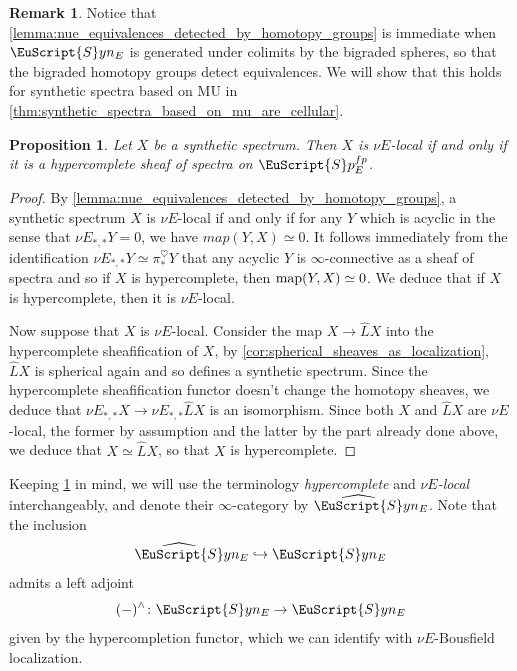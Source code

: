 \documentclass[oneside,a4paper]{amsart}
\newcommand{\euscr}[1]{\EuScript{#1}} %
\newcommand{\map}{\textnormal{map}} %
\newcommand{\MU}{\mathrm{MU}} %
\newcommand{\spectra}{\euscr{S}p} %
\newcommand{\synspectra}{\euscr{S}yn} %
\newcommand{\hpsynspectra}{\widehat{\euscr{S}}yn} %
\theoremstyle{plain}
\newtheorem{prop}[thm]{Proposition}
\theoremstyle{definition}
\newtheorem{rem}[thm]{Remark}
\theoremstyle{remark}
\begin{document}
\begin{rem}
Notice that \cref{lemma:nue_equivalences_detected_by_homotopy_groups} is immediate when $\synspectra_{E}$ is generated under colimits by the bigraded spheres, so that the bigraded homotopy groups detect equivalences. We will show that this holds for synthetic spectra based on $\MU$ in \cref{thm:synthetic_spectra_based_on_mu_are_cellular}.
\end{rem}

\begin{prop}
\label{prop:synthetic_spectrum_nue_local_iff_hypercomplete}
Let $X$ be a synthetic spectrum. Then $X$ is $\nu E$-local if and only if it is a hypercomplete sheaf of spectra on $\spectra_{E}^{fp}$. 
\end{prop}

\begin{proof}
By \cref{lemma:nue_equivalences_detected_by_homotopy_groups}, a synthetic spectrum $X$ is $\nu E$-local if and only if for any $Y$ which is acyclic in the sense that $\nu E_{*, *}Y = 0$, we have $map(Y, X) \simeq 0$. It follows immediately from the identification $\nu E_{*, *} Y \simeq \pi_{*}^{\heartsuit} Y$ that any acyclic $Y$ is $\infty$-connective as a sheaf of spectra and so if $X$ is hypercomplete, then $\map(Y, X) \simeq 0$. We deduce that if $X$ is hypercomplete, then it is $\nu E$-local. 

Now suppose that $X$ is $\nu E$-local. Consider the map $X \rightarrow \widehat{L}X$ into the hypercomplete sheafification of $X$, by \cref{cor:spherical_sheaves_as_localization}, $\widehat{L}X$ is spherical again and so defines a synthetic spectrum. Since the hypercomplete sheafification functor doesn't change the homotopy sheaves, we deduce that $\nu E_{*, *} X \rightarrow \nu E_{*, *} \widehat{L}X$ is an isomorphism. Since both $X$ and $\widehat{L}X$ are $\nu E$-local, the former by assumption and the latter by the part already done above, we deduce that $X \simeq \widehat{L}X$, so that $X$ is hypercomplete. 
\end{proof}
Keeping \cref{prop:synthetic_spectrum_nue_local_iff_hypercomplete} in mind, we will use the terminology \emph{hypercomplete} and \emph{$\nu E$-local} interchangeably, and denote their $\infty$-category by $\hpsynspectra_{E}$. Note that the inclusion 
\[
\hpsynspectra_{E} \hookrightarrow \synspectra_{E}
\]
admits a left adjoint
\[
(-)^{\wedge} \colon \synspectra_{E} \rightarrow \synspectra_{E}
\]
given by the hypercompletion functor, which we can identify with  $\nu E$-Bousfield localization. 
\end{document}
